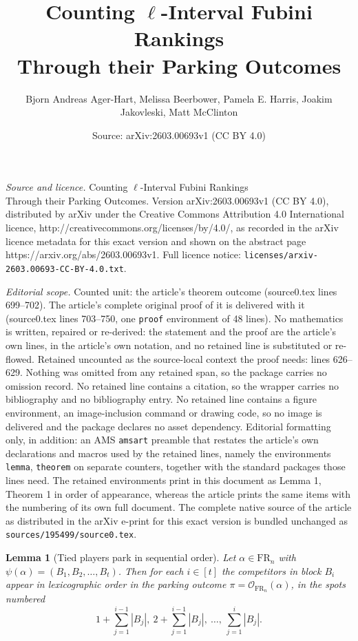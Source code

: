 \documentclass[10pt,a4paper]{amsart}
\title{Counting $\ell$-Interval Fubini Rankings\\Through their Parking Outcomes}
\author{Bjorn Andreas Ager-Hart, Melissa Beerbower, Pamela E. Harris, Joakim Jakovleski, Matt McClinton}
\date{Source: arXiv:2603.00693v1 (CC BY 4.0)}
\newtheorem{lemma}{Lemma}
\newcommand{\FR}[1]{\mathrm{FR}_{#1}}
\newcommand{\out}{\mathcal{O}}
\begin{document}
\maketitle

\noindent\emph{Source and licence.} Counting $\ell$-Interval Fubini Rankings\\Through their Parking Outcomes. Version arXiv:2603.00693v1 (CC BY 4.0), distributed by arXiv under the Creative Commons Attribution 4.0 International licence, http://creativecommons.org/licenses/by/4.0/, as recorded in the arXiv licence metadata for this exact version and shown on the abstract page https://arxiv.org/abs/2603.00693v1. Full licence notice: \texttt{licenses/arxiv-2603.00693-CC-BY-4.0.txt}.\par\smallskip

\noindent\textit{Editorial scope.} Counted unit: the article's theorem outcome (source0.tex lines 699--702). The article's complete original proof of it is delivered with it (source0.tex lines 703--750, one \texttt{proof} environment of 48 lines). No mathematics is written, repaired or re-derived: the statement and the proof are the article's own lines, in the article's own notation, and no retained line is substituted or re-flowed.  Retained uncounted as the source-local context the proof needs: lines 626--629.  Nothing was omitted from any retained span, so the package carries no omission record.  No retained line contains a citation, so the wrapper carries no bibliography and no bibliography entry.  No retained line contains a figure environment, an image-inclusion command or drawing code, so no image is delivered and the package declares no asset dependency.  Editorial formatting only, in addition: an AMS \texttt{amsart} preamble that restates the article's own declarations and macros used by the retained lines, namely the environments \texttt{lemma}, \texttt{theorem} on separate counters, together with the standard packages those lines need.  The retained environments print in this document as Lemma 1, Theorem 1 in order of appearance, whereas the article prints the same items with the numbering of its own full document.  The complete native source of the article as distributed in the arXiv e-print for this exact version is bundled unchanged as \texttt{sources/195499/source0.tex}.
\begin{lemma}[Tied players park in sequential order]\label{lemma: competitor outcome for ties}
    Let $\alpha\in\FR{n}$ with $\psi(\alpha)=(B_1,B_2,\ldots,B_t)$.
    Then for each $i\in[t]$ the competitors in block $B_i$ appear in lexicographic order in the parking outcome $\pi = \out_{\FR{n}}(\alpha)$, in the spots numbered \[1+\sum_{j=1}^{i-1}|B_j|,~2+\sum_{j=1}^{i-1}|B_j|,~\ldots,~ \sum_{j=1}^{i}|B_j|. \]
\end{lemma}
\end{document}
